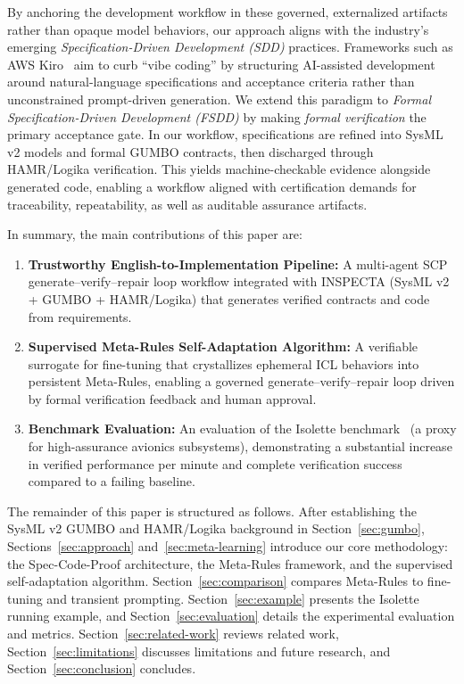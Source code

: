 \documentclass[conference]{IEEEtran}
\begin{document}
By anchoring the development workflow in these governed, externalized artifacts rather than opaque model behaviors, our approach aligns with the industry's emerging \textit{Specification-Driven Development (SDD)} practices. Frameworks such as AWS Kiro~\cite{amazon2024mathematical} aim to curb ``vibe coding'' by structuring AI-assisted development around natural-language specifications and acceptance criteria rather than unconstrained prompt-driven generation. We extend this paradigm to \textit{Formal Specification-Driven Development (FSDD)} by making \emph{formal verification} the primary acceptance gate. In our workflow, specifications are refined into SysML v2 models and formal GUMBO contracts, then discharged through HAMR/Logika verification. This yields machine-checkable evidence alongside generated code, enabling a workflow aligned with certification demands for traceability, repeatability, as well as auditable assurance artifacts.

In summary, the main contributions of this paper are:
\begin{enumerate}
    \item \textbf{Trustworthy English-to-Implementation Pipeline:} A multi-agent SCP generate--verify--repair loop workflow integrated with INSPECTA (SysML v2 + GUMBO + HAMR/Logika) that generates verified contracts and code from requirements.
    \item \textbf{Supervised Meta-Rules Self-Adaptation Algorithm:} A verifiable surrogate for fine-tuning that crystallizes ephemeral ICL behaviors into persistent Meta-Rules, enabling a governed generate--verify--repair loop driven by formal verification feedback and human approval.
    \item \textbf{Benchmark Evaluation:} An evaluation of the Isolette benchmark~\cite{hatcliff2024isolette} (a proxy for high-assurance avionics subsystems), demonstrating a substantial increase in verified performance per minute and complete verification success compared to a failing baseline.
\end{enumerate}

The remainder of this paper is structured as follows. After establishing the SysML v2 GUMBO and HAMR/Logika background in Section~\ref{sec:gumbo}, Sections~\ref{sec:approach} and~\ref{sec:meta-learning} introduce our core methodology: the Spec-Code-Proof architecture, the Meta-Rules framework, and the supervised self-adaptation algorithm. Section~\ref{sec:comparison} compares Meta-Rules to fine-tuning and transient prompting. Section~\ref{sec:example} presents the Isolette running example, and Section~\ref{sec:evaluation} details the experimental evaluation and metrics. Section~\ref{sec:related-work} reviews related work, Section~\ref{sec:limitations} discusses limitations and future research, and Section~\ref{sec:conclusion} concludes. 
\end{document}
